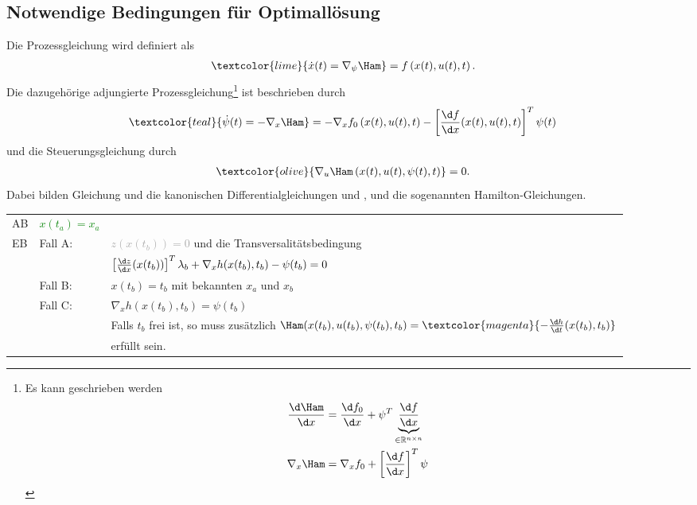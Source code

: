 \subsection{Notwendige Bedingungen für Optimallösung}
Die Prozessgleichung wird definiert als
\begin{align}
	\textcolor{lime}{\dot{x}(t) = \nabla_{\psi}\Ham} & = f\left(x(t),u(t),t \right). \label{eqn:kap_2_prozessgleichung}
\end{align}
Die dazugehörige adjungierte Prozessgleichung\footnote{Es kann geschrieben werden \begin{align*}
\frac{\d\Ham}{\d x} & = \frac{\d f_0}{\d x}+\psi^T\underbrace{\frac{\d f}{\d x}}_{\in\mathbb{R}^{n\times n}}\\
\nabla_x\Ham & = \nabla_x f_0+\left[\frac{\d f}{\d x} \right]^T\psi
\end{align*}} ist beschrieben durch
\begin{align}
	\textcolor{teal}{\dot{\psi}(t) = -\nabla_x\Ham } & = -\nabla_x f_0\left(x(t),u(t),t \right)-\left[\frac{\d f}{\d x}(x(t),u(t),t) \right]^T\psi(t) \label{eqn:kap_2_adj_prozessglg}
\end{align}
und die Steuerungsgleichung durch
\begin{align}
	\textcolor{olive}{\nabla_u\Ham\left(x(t),u(t),\psi(t),t \right)} & = 0. \label{eqn:kap_2_steuergleichung}
\end{align}
Dabei bilden Gleichung  und  die kanonischen Differentialgleichungen und ,
 und  die sogenannten Hamilton-Gleichungen.\\
\begin{tabular}{lll}
\ac{AB} & \textcolor{green}{$x(t_a)=x_a$}\\
\ac{EB} & Fall A: 	& \textcolor{darkgray}{$z(x(t_b))=0$} und die Transversalitätsbedingung\\
		&			& \textcolor{cyan}{$\left[\frac{\d z}{\d x}(x(t_b)) \right]^T\lambda_b +\nabla_x
h(x(t_b),t_b)-\psi(t_b)=0$} \\
		& Fall B: 	& $x(t_b)=t_b$ mit bekannten $x_a$ und $x_b$\\
		& Fall C: 	& $\nabla_x h(x(t_b),t_b)=\psi(t_b)$\\
		&			& Falls $t_b$ frei ist, so muss zusätzlich $\Ham(x(t_b),u(t_b),\psi(t_b),t_b)=\textcolor{magenta}{-\frac{\d h}{\d t}(x(t_b),t_b)}$\\
		&			& erfüllt sein.
\end{tabular}

